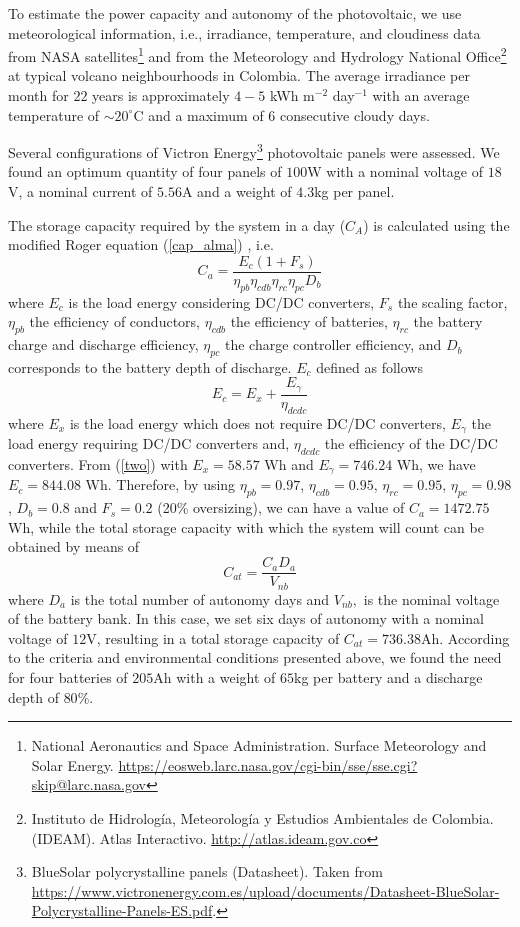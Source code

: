 \documentclass[letterpaper,11pt]{article}
\begin{document}
To estimate the power capacity and autonomy of the photovoltaic, we use meteorological information, i.e., irradiance, temperature, and cloudiness data from NASA satellites\footnote{National Aeronautics and Space Administration. Surface Meteorology and Solar Energy. \url{https://eosweb.larc.nasa.gov/cgi-bin/sse/sse.cgi?skip@larc.nasa.gov}} and from the Meteorology and Hydrology National Office\footnote{Instituto de Hidrología, Meteorología y Estudios Ambientales de Colombia. (IDEAM). Atlas Interactivo. \url{http://atlas.ideam.gov.co}} at typical volcano neighbourhoods in Colombia. The average irradiance per month for $22$ years is approximately $4-5$ kWh m$^{-2}$ day$^{-1}$ with an average temperature of $\sim 20^{\circ}$C and a maximum of $6$ consecutive cloudy days.

Several configurations of Victron Energy\footnote{BlueSolar polycrystalline panels (Datasheet). Taken from \url{https://www.victronenergy.com.es/upload/documents/Datasheet-BlueSolar-Polycrystalline-Panels-ES.pdf}.} photovoltaic panels were assessed. We found an optimum quantity of four panels of $100$W with a nominal voltage of $18$V, a nominal current of $5.56$A and a weight of $4.3$kg per panel.

The storage capacity required by the system in a day ($C_A$) is calculated using the modified Roger equation (\ref{cap_alma}) \cite{messenger2017photovoltaic}, i.e. 
\begin{equation}
C_a=\frac{E_c(1+F_s)}{\eta_{pb}\eta_{cdb}\eta_{rc}\eta_{pc}D_{b}} \label{cap_alma}
\end{equation}
where $E_c$ is the load energy considering DC/DC converters, $F_s$ the scaling factor, $\eta_{pb}$ the efficiency of conductors, $\eta_{cdb}$ the efficiency of batteries, $\eta_{rc}$ the battery charge and discharge efficiency, $\eta_{pc}$ the charge controller efficiency, and $D_{b}$ corresponds to the battery depth of discharge. $E_c$ defined as follows
\begin{equation}
E_c=E_x+\frac{E_{\gamma}}{\eta_{dcdc}}
\label{two}
\end{equation}
where $E_{x}$ is the load energy which does not require DC/DC converters, $E_{\gamma}$ the load energy requiring DC/DC converters and, $\eta_{dcdc}$ the efficiency of the DC/DC converters. From (\ref{two}) with $E_{x}=58.57$ Wh and $E_{\gamma}=746.24$ Wh, we have $E_c=844.08$ Wh. Therefore, by using $\eta_{pb}=0.97$, $\eta_{cdb}=0.95$, $\eta_{rc}=0.95$, $\eta_{pc}=0.98$, $D_{b}=0.8$ and $F_s=0.2$ (20\% oversizing), we can have a value of $C_a=1472.75$ Wh, while the total storage capacity with which the system will count can be obtained by means of
\begin{equation}
C_{at}=\frac{C_aD_a}{V_{nb}}
\end{equation}
where $D_a$ is the total number of autonomy days and $V_{nb}, $ is the nominal voltage of the battery bank. In this case, we set six days of autonomy with a nominal voltage of $12$V, resulting in a total storage capacity of $C_{at}=736.38$Ah. According to the criteria and environmental conditions presented above, we found the need for four batteries of $205$Ah with a weight of $65$kg per battery and a discharge depth of $80\%$.
\end{document}
